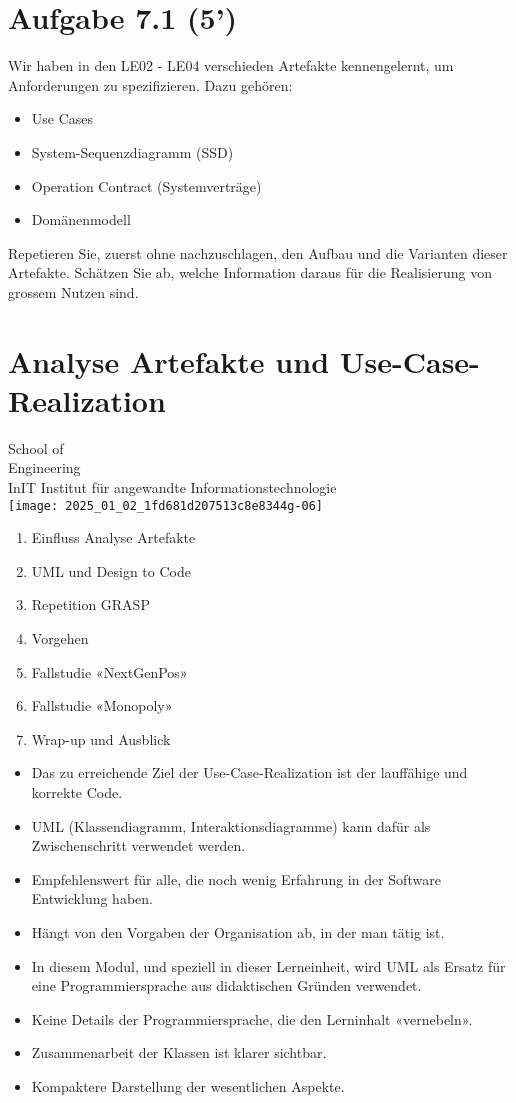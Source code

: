 \documentclass[10pt]{article}
\begin{document}
\section*{Aufgabe 7.1 (5’)}
Wir haben in den LE02 - LE04 verschieden Artefakte kennengelernt, um Anforderungen zu spezifizieren. Dazu gehören:

\begin{itemize}
  \item Use Cases
  \item System-Sequenzdiagramm (SSD)
  \item Operation Contract (Systemverträge)
  \item Domänenmodell
\end{itemize}

Repetieren Sie, zuerst ohne nachzuschlagen, den Aufbau und die Varianten dieser Artefakte. Schätzen Sie ab, welche Information daraus für die Realisierung von grossem Nutzen sind.

\section*{Analyse Artefakte und Use-Case-Realization}
School of\\
Engineering\\
InIT Institut für angewandte Informationstechnologie\\
\texttt{[image: 2025\_01\_02\_1fd681d207513c8e8344g-06]}

\begin{enumerate}
  \item Einfluss Analyse Artefakte
  \item UML und Design to Code
  \item Repetition GRASP
  \item Vorgehen
  \item Fallstudie «NextGenPos»
  \item Fallstudie «Monopoly»
  \item Wrap-up und Ausblick
\end{enumerate}

\begin{itemize}
  \item Das zu erreichende Ziel der Use-Case-Realization ist der lauffähige und korrekte Code.
  \item UML (Klassendiagramm, Interaktionsdiagramme) kann dafür als Zwischenschritt verwendet werden.
  \item Empfehlenswert für alle, die noch wenig Erfahrung in der Software Entwicklung haben.
  \item Hängt von den Vorgaben der Organisation ab, in der man tätig ist.
  \item In diesem Modul, und speziell in dieser Lerneinheit, wird UML als Ersatz für eine Programmiersprache aus didaktischen Gründen verwendet.
  \item Keine Details der Programmiersprache, die den Lerninhalt «vernebeln».
  \item Zusammenarbeit der Klassen ist klarer sichtbar.
  \item Kompaktere Darstellung der wesentlichen Aspekte.
\end{itemize}
\end{document}
